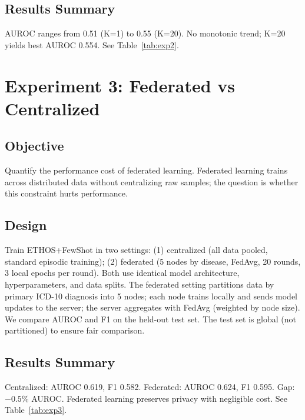 \subsection{Results Summary}

AUROC ranges from 0.51 (K=1) to 0.55 (K=20). No monotonic trend; K=20 yields best AUROC 0.554. See Table~\ref{tab:exp2}.

\section{Experiment 3: Federated vs Centralized}

\subsection{Objective}

Quantify the performance cost of federated learning. Federated learning trains across distributed data without centralizing raw samples; the question is whether this constraint hurts performance.

\subsection{Design}

Train ETHOS+FewShot in two settings: (1) centralized (all data pooled, standard episodic training); (2) federated (5 nodes by disease, FedAvg, 20 rounds, 3 local epochs per round). Both use identical model architecture, hyperparameters, and data splits. The federated setting partitions data by primary ICD-10 diagnosis into 5 nodes; each node trains locally and sends model updates to the server; the server aggregates with FedAvg (weighted by node size). We compare AUROC and F1 on the held-out test set. The test set is global (not partitioned) to ensure fair comparison.

\subsection{Results Summary}

Centralized: AUROC 0.619, F1 0.582. Federated: AUROC 0.624, F1 0.595. Gap: $-0.5\%$ AUROC. Federated learning preserves privacy with negligible cost. See Table~\ref{tab:exp3}.


